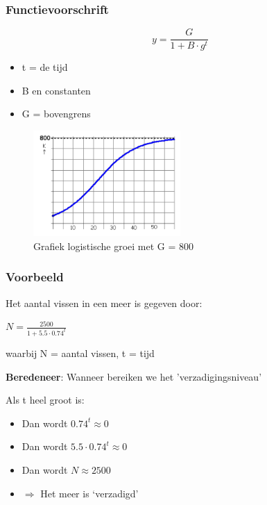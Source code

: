 \documentclass{article}
\begin{document}
\subsubsection{Functievoorschrift}

\begin{equation}
y = \frac{G}{1 + B\cdot g^t}
\end{equation}

\begin{itemize}
    \item t = de tijd
    \item B en constanten
    \item G = bovengrens
\end{itemize}

\begin{figure}[H]
    \centering
    \includegraphics[width=0.5\textwidth]{logistische-groei.png}
    \caption{Grafiek logistische groei met G = 800}
\end{figure}

\subsubsection{Voorbeeld}

Het aantal vissen in een meer is gegeven door:

\begin{center}
    $N = \frac{2500}{1 + 5.5 \cdot 0.74^t}$
\end{center}

waarbij N = aantal vissen, t = tijd

\textbf{Beredeneer}: Wanneer bereiken we het 'verzadigingsniveau'

Als t heel groot is:

\begin{itemize}
    \item Dan wordt $0.74^t \approx 0$
    \item Dan wordt $5.5 \cdot 0.74^t \approx 0$
    \item Dan wordt $N \approx 2500$
    \item $\Rightarrow$ Het meer is `verzadigd'
\end{itemize}
\end{document}
